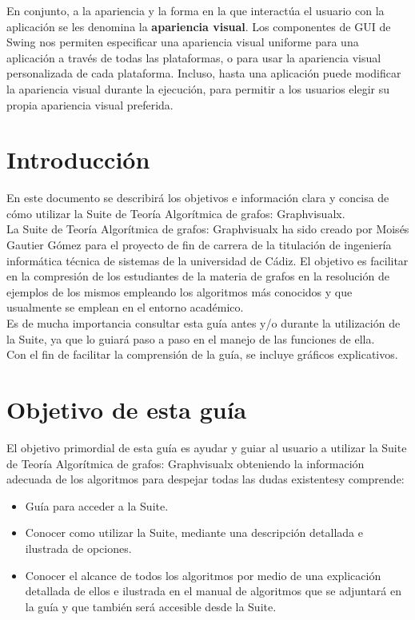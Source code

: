 En conjunto, a la apariencia y la forma en la que interactúa el usuario con la aplicación se les denomina la \textbf{apariencia visual}. Los componentes de GUI de Swing nos permiten especificar una apariencia visual uniforme para una aplicación a través de todas las plataformas, o para usar la apariencia visual personalizada de cada plataforma. Incluso, hasta una aplicación puede modificar la apariencia visual durante la ejecución, para permitir a los usuarios elegir su propia apariencia visual preferida.\\


\section{Introducción}

En este documento se describirá los objetivos e información clara y concisa de cómo utilizar la Suite de Teoría Algorítmica de grafos: Graphvisualx.\\

La Suite de Teoría Algorítmica de grafos: Graphvisualx ha sido creado por Moisés Gautier Gómez para el proyecto de fin de carrera de la titulación de ingeniería informática técnica de sistemas de la universidad de Cádiz. El objetivo es facilitar en la compresión de los estudiantes de la materia de grafos en la resolución de ejemplos de los mismos empleando los algoritmos más conocidos y que usualmente se emplean en el entorno académico.\\

Es de mucha importancia consultar esta guía antes y/o durante la utilización de la Suite, ya que lo guiará paso a paso en el manejo de las funciones de ella.\\

Con el fin de facilitar la comprensión de la guía, se incluye gráficos explicativos.\\

\section{Objetivo de esta guía}

El objetivo primordial de esta guía es ayudar y guiar al usuario a utilizar la Suite de Teoría Algorítmica de grafos: Graphvisualx obteniendo la información adecuada de los algoritmos para despejar todas las dudas existentesy comprende:

\begin{itemize}
\item Guía para acceder a la Suite.
\item Conocer como utilizar la Suite, mediante una descripción detallada e ilustrada de opciones.
\item Conocer el alcance de todos los algoritmos por medio de una explicación detallada de ellos e ilustrada en el manual de algoritmos que se adjuntará en la guía y que también será accesible desde la Suite.
\end{itemize}

